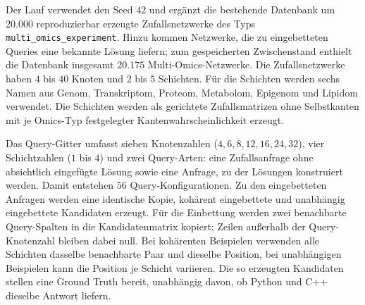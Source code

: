 \documentclass[a4paper,12pt, twoside]{report}
\theoremstyle{definition}
\begin{document}
Der Lauf verwendet den Seed $42$ und ergänzt die bestehende Datenbank um $20.000$ reproduzierbar erzeugte Zufallsnetzwerke des Typs \texttt{multi\_omics\_experiment}. Hinzu kommen Netzwerke, die zu eingebetteten Queries eine bekannte Lösung liefern; zum gespeicherten Zwischenstand enthielt die Datenbank insgesamt $20.175$ Multi-Omics-Netzwerke. Die Zufallsnetzwerke haben $4$ bis $40$ Knoten und $2$ bis $5$ Schichten. Für die Schichten werden sechs Namen aus Genom, Transkriptom, Proteom, Metabolom, Epigenom und Lipidom verwendet. Die Schichten werden als gerichtete Zufallsmatrizen ohne Selbstkanten mit je Omics-Typ festgelegter Kantenwahrscheinlichkeit erzeugt.

Das Query-Gitter umfasst sieben Knotenzahlen ($4,6,8,12,16,24,32$), vier Schichtzahlen ($1$ bis $4$) und zwei Query-Arten: eine Zufallsanfrage ohne absichtlich eingefügte Lösung sowie eine Anfrage, zu der Lösungen konstruiert werden. Damit entstehen $56$ Query-Konfigurationen. Zu den eingebetteten Anfragen werden eine identische Kopie, kohärent eingebettete und unabhängig eingebettete Kandidaten erzeugt. Für die Einbettung werden zwei benachbarte Query-Spalten in die Kandidatenmatrix kopiert; Zeilen außerhalb der Query-Knotenzahl bleiben dabei null. Bei kohärenten Beispielen verwenden alle Schichten dasselbe benachbarte Paar und dieselbe Position, bei unabhängigen Beispielen kann die Position je Schicht variieren. Die so erzeugten Kandidaten stellen eine Ground Truth bereit, unabhängig davon, ob Python und C++ dieselbe Antwort liefern.
\end{document}
